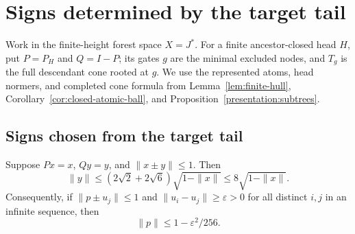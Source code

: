 \section{Signs determined by the target tail}

Work in the finite-height forest space $X=J^*$. For a finite
ancestor-closed head $H$, put $P=P_H$ and $Q=I-P$; its gates $g$
are the minimal excluded nodes, and $T_g$ is the full descendant
cone rooted at $g$. We use the represented atoms, head normers,
and completed cone formula from Lemma~\ref{lem:finite-hull},
Corollary~\ref{cor:closed-atomic-ball}, and
Proposition~\ref{presentation:subtrees}.

\subsection{Signs chosen from the target tail}
\label{molb:sec:target-signs}

\begin{proposition}\label{molb:prop:target-signs}
Suppose \(Px=x\), \(Qy=y\), and \(\|x\pm y\|\le1\).  Then
\begin{equation}\label{molb:eq:target-sign-bound}
 \|y\|\le(2\sqrt2+2\sqrt6)\sqrt{1-\|x\|}
                         \le8\sqrt{1-\|x\|}.
\end{equation}
Consequently, if \(\|p\pm u_j\|\le1\) and
\(\|u_i-u_j\|\ge\varepsilon>0\) for all distinct \(i,j\) in an
infinite sequence, then
\begin{equation}\label{molb:eq:target-separated}
 \|p\|\le1-\varepsilon^2/256.
\end{equation}
\end{proposition}

